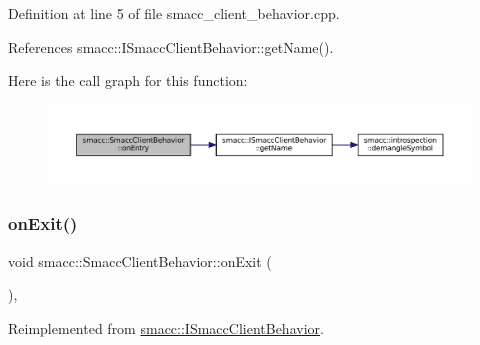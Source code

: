 Definition at line 5 of file smacc\+\_\+client\+\_\+behavior.\+cpp.



References smacc\+::\+I\+Smacc\+Client\+Behavior\+::get\+Name().


Here is the call graph for this function\+:
\nopagebreak
\begin{figure}[H]
\begin{center}
\leavevmode
\includegraphics[width=350pt]{classsmacc_1_1SmaccClientBehavior_ad5d3e1f1697c3cfe66c94cadba948493_cgraph}
\end{center}
\end{figure}
\mbox{\label{classsmacc_1_1SmaccClientBehavior_a7e4fb6ce81ff96dc172425852d69c0c5}} 
\subsubsection{\texorpdfstring{on\+Exit()}{onExit()}}
{\footnotesize\ttfamily void smacc\+::\+Smacc\+Client\+Behavior\+::on\+Exit (\begin{DoxyParamCaption}{ }\end{DoxyParamCaption})\hspace{0.3cm}{\ttfamily [override]}, {\ttfamily [virtual]}}



Reimplemented from \hyperlink{classsmacc_1_1ISmaccClientBehavior_ad1198fdb2cbdf11f3276d3e23d4c0a50}{smacc\+::\+I\+Smacc\+Client\+Behavior}.



